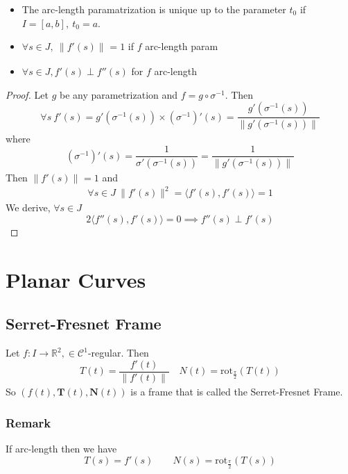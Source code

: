 \begin{prop}[]
    \begin{itemize}
      \item  The arc-length paramatrization is unique up to the parameter $ t_0 $ if $ I = [a,b],\
    t_0 = a $.
\item $ \forall s \in J, \ \| f'(s) \|^{ }_{ } = 1 $ if $ f $ arc-length param 
\item $ \forall s \in J, f'(s) \perp f''(s)  $ for $ f $ arc-length
    \end{itemize}  
\end{prop}
\begin{proof}
    Let $ g $ be any parametrization and $ f = g \circ \sigma^{-1}  $. Then 
    \[
        \forall s \ f'(s) = g'\left( \sigma^{-1} (s) \right) \times \left(
        \sigma^{-1}\right) '(s) = \frac{ g'\left( \sigma^{-1}(s)\right)  }{ \| g'\left(
    \sigma^{-1}(s)\right)  \|^{ }_{ }  } 
    \]
    where 
    \[ \left( \sigma^{-1}\right)' (s) = \frac{ 1 }{ \sigma'\left(\sigma^{-1}(s)\right) } = 
    \frac{ 1 }{ \| g'\left( \sigma^{-1}(s)\right)  \|^{ }_{ }  } \]
    Then $ \| f'(s) \|^{ }_{ } = 1 $ and 
    \[
        \forall s \in J \ \| f'(s) \|^{ 2}_{ } = \langle f'(s) , f'(s) \rangle = 1
    \]
    We derive, $ \forall s \in J  $
    \[
        2 \langle f''(s)  , f'(s)  \rangle = 0 \implies f''(s) \perp f'(s)
    \]
\end{proof}

\section{Planar Curves}
\label{sec:Planar Curves}
\subsection{Serret-Fresnet Frame}
\label{subsec:Serret-Fresnet Frame}
Let $ f : I \to \mathbb{R}^2, \in \mathscr{ C } ^1 $-regular. Then 
\[
    T(t) = \frac{ f'(t)  }{ \| f'(t) \|^{ }_{ }  } \quad N(t) = \text{rot}_{ \frac{ \pi }{
    2}} \left( T(t)\right) 
\]
So $ \left( f(t), \boldsymbol{T}(t), \boldsymbol{N} (t) \right)  $ is a frame that is
called the Serret-Fresnet Frame.

\subsubsection{Remark}
If arc-length then we have 
\[
    T(s) = f'(s) \qquad N(s) = \text{rot} _{ \frac{ \pi }{ 2 } }\left( T(s)\right) 
\]

